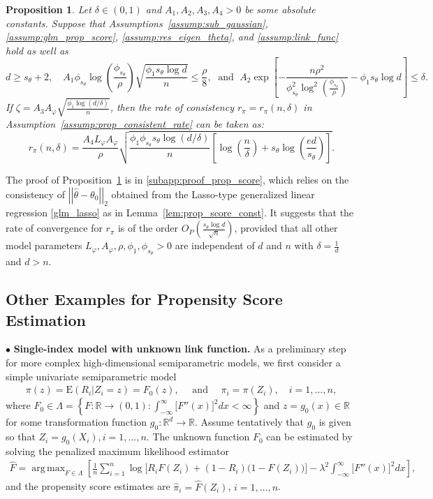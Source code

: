\documentclass[ejsv2,noshowframe]{imsart}
\theoremstyle{plain}
\newtheorem{proposition}[theorem]{Proposition}
\theoremstyle{definition}
\theoremstyle{remark}
\DeclareMathOperator*{\argmax}{arg\,max}
\newcommand{\norm}[1]{\left|\left| #1 \right|\right|}
\renewcommand{\hat}{\widehat}
\begin{document}
\begin{proposition}
	\label{prop:rel_const_glm}
	Let $\delta \in (0,1)$ and $A_1,A_2,A_3,A_4>0$ be some absolute constants. Suppose that Assumptions~\ref{assump:sub_gaussian}, \ref{assump:glm_prop_score}, \ref{assump:res_eigen_theta}, and \ref{assump:link_func} hold as well as
	$$d \geq s_{\theta} + 2, \quad A_1\phi_{s_{\theta}} \log\left(\frac{\phi_{s_{\theta}}}{\rho}\right) \sqrt{\frac{\phi_1 s_{\theta}\log d}{n}} \leq \frac{\rho}{8}, \; \text{ and }\;   A_2\exp\left[-\frac{n\rho^2}{\phi_{s_{\theta}}^2 \log^2\left(\frac{\phi_{s_{\theta}}}{\rho}\right)} - \phi_1 s_{\theta}\log d\right] \leq \delta.$$
	If $\zeta =A_3 A_{\varphi} \sqrt{\frac{\phi_1\log(d/\delta)}{n}}$, then the rate of consistency $r_{\pi}=r_{\pi}(n,\delta)$ in Assumption~\ref{assump:prop_consistent_rate} can be taken as:
	$$r_{\pi}(n,\delta) = \frac{A_4 L_{\varphi} A_{\varphi}}{\rho} \sqrt{\frac{\phi_1 \phi_{s_{\theta}} s_{\theta} \log(d/\delta)}{n}\left[\log\left(\frac{n}{\delta}\right) + s_{\theta} \log\left(\frac{e d}{s_{\theta}} \right) \right]}.$$
\end{proposition}

The proof of Proposition~\ref{prop:rel_const_glm} is in \autoref{subapp:proof_prop_score}, which relies on the consistency of $\norm{\hat{\theta}-\theta_0}_2$ obtained from the Lasso-type generalized linear regression \eqref{glm_lasso} as in Lemma~\ref{lem:prop_score_const}. It suggests that the rate of convergence for $r_{\pi}$ is of the order $O_P\left(\frac{s_{\theta}\log d}{\sqrt{n}}\right)$, provided that all other model parameters $L_{\varphi}, A_{\varphi}, \rho, \phi_1,\phi_{s_{\theta}} >0$ are independent of $d$ and $n$ with $\delta = \frac{1}{d}$ and $d>n$.


\subsection{Other Examples for Propensity Score Estimation}
\label{app:prop_est_eg}

$\bullet$ \textbf{Single-index model with unknown link function.} As a preliminary step for more complex high-dimensional semiparametric models, we first consider a simple univariate semiparametric model %
\begin{align*}
	\pi(z) = \mathrm{E}(R_i|Z_i = z) = F_0(z), \quad \text{ and } \quad \pi_i=\pi(Z_i), \quad i = 1, \ldots, n,
\end{align*}
where $F_0 \in \Lambda = \left\{ F : \mathbb{R} \rightarrow (0,1) : \int_{-\infty}^{\infty} \big[F''(x)\big]^2 dx < \infty \right\}$ and $z=g_0(x) \in \mathbb{R}$ for some transformation function $g_0:\mathbb{R}^d\to \mathbb{R}$. Assume tentatively that $g_0$ is given so that $Z_i=g_0(X_i), i=1,...,n$.
The unknown function $F_0$ can be estimated by solving the penalized maximum likelihood estimator
\begin{align*}
	\hat{F} = \argmax_{ F \in \Lambda}  \left[\frac{1}{n} \sum_{i=1}^n  \log \big[ R_iF(Z_i) + (1 - R_i) \big(1- F(Z_i)\big) \big] - \lambda^2\int_{-\infty}^\infty  \big[F''(x)\big]^2 dx \right],
\end{align*}
and the propensity score estimates are $\hat{\pi}_i = \hat{F}(Z_i)$, $i=1, \ldots, n$.
\end{document}
